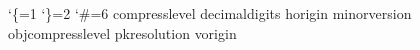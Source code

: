 

\begingroup
  \catcode`\{=1 %
  \catcode`\}=2 %
  \catcode`\#=6 %
  \def\list{%
      {compresslevel}%
      {decimaldigits}%
      {horigin}%
      {minorversion}%
      {objcompresslevel}%
      {pkresolution}%
      {vorigin}%
  }%
  \let\pdfoutput\outputmode
  \let\pdfpageheight\pageheight
  \let\pdfpagewidth\pagewidth
  \def\do#1{%
    \ifx\relax#1\else
      \expandafter\edef\csname pdf#1\endcsname{\pdfvariable #1}%
      \expandafter\do
    \fi
  }%
  \expandafter\do\list\relax
  \ifx\dvimode\relax
    \pdfoutput=0 %
  \fi
  \let\dvimode\undefined
\endgroup
